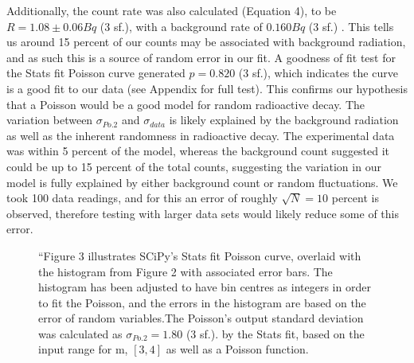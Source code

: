 \documentclass[11pt]{article}
\begin{document}
Additionally, the count rate was also calculated (Equation 4), to be $R = 1.08 \pm 0.06  Bq$ (3 sf.), with a background rate of $0.160 Bq$ (3 sf.) . This tells us around 15 percent of our counts may be associated with background radiation, and as such this is a source of random error in our fit.
A goodness of fit test for the Stats fit Poisson curve generated $p = 0.820$ (3 sf.), which indicates the curve is a good fit to our data (see Appendix for full test). This confirms our hypothesis that a Poisson would be a good model for random radioactive decay. 
The variation between $\sigma_{Po.2}$ and $\sigma_{data}$ is likely explained by the background radiation as well as the inherent randomness in radioactive decay. The experimental data was within 5 percent of the model, whereas the background count suggested it could be up to 15 percent of the total counts, suggesting the variation in our model is fully explained by either background count or random fluctuations.  We took 100 data readings, and for this an error of roughly $\sqrt{N} = 10$ percent is observed, therefore testing with larger data sets would likely reduce some of this error.  
       \begin{figure}[]
        \begin{center}
            \def\svgwidth{\columnwidth}
            
             \caption{“Figure 3 illustrates SCiPy's Stats fit Poisson curve, overlaid with the histogram from Figure 2 with associated error bars. The histogram has been adjusted to have bin centres as integers in order to fit the Poisson, and the errors in the histogram are based on the error of random variables.The Poisson's output standard deviation was calculated as $\sigma_{Po.2} = 1.80$ (3 sf.). by the Stats fit,  based on the input range for m, $[3,4]$ as well as a Poisson function.}
             \label{fig:experimental results 2}
        \end{center}
    \end{figure}
\end{document}
